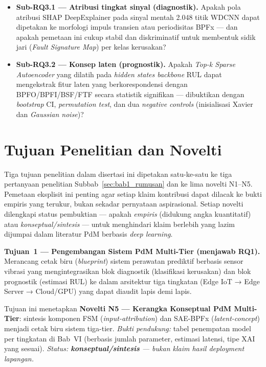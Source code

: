 \begin{itemize}
  \item \textbf{Sub-RQ3.1 — Atribusi tingkat sinyal (diagnostik).}
        Apakah pola atribusi SHAP DeepExplainer pada sinyal mentah
        2.048 titik WDCNN dapat dipetakan ke morfologi impuls transien
        atau periodisitas BPFx --- dan apakah pemetaan ini cukup
        stabil dan diskriminatif untuk membentuk sidik jari
        (\emph{Fault Signature Map}) per kelas kerusakan?
  \item \textbf{Sub-RQ3.2 — Konsep laten (prognostik).}
        Apakah \emph{Top-k Sparse Autoencoder} yang dilatih pada
        \emph{hidden states backbone} RUL dapat mengekstrak fitur
        laten yang berkorespondensi dengan BPFO/BPFI/BSF/FTF secara
        statistik signifikan --- dibuktikan dengan \emph{bootstrap} CI,
        \emph{permutation test}, dan dua \emph{negative controls}
        (inisialisasi Xavier dan \emph{Gaussian noise})?
\end{itemize}


\section{Tujuan Penelitian dan Novelti}
\label{sec:bab1_tujuan}

Tiga tujuan penelitian dalam disertasi ini dipetakan satu-ke-satu
ke tiga pertanyaan penelitian Subbab~\ref{sec:bab1_rumusan} dan ke lima
novelti N1–N5.
Pemetaan eksplisit ini penting agar setiap klaim kontribusi dapat
dilacak ke bukti empiris yang terukur, bukan sekadar pernyataan
aspirasional.
Setiap novelti dilengkapi status pembuktian --- apakah
\emph{empiris} (didukung angka kuantitatif) atau
\emph{konseptual/sintesis} --- untuk menghindari klaim berlebih yang
lazim dijumpai dalam literatur PdM berbasis \emph{deep learning}.

\textbf{Tujuan~1 — Pengembangan Sistem PdM Multi-Tier (menjawab RQ1).}
Merancang cetak biru (\emph{blueprint}) sistem perawatan prediktif
berbasis sensor vibrasi yang mengintegrasikan blok diagnostik
(klasifikasi kerusakan) dan blok prognostik (estimasi RUL) ke dalam
arsitektur tiga tingkatan (Edge IoT → Edge Server → Cloud/GPU) yang
dapat diaudit lapis demi lapis.

Tujuan ini menetapkan \textbf{Novelti N5 — Kerangka Konseptual PdM
Multi-Tier}: sintesis komponen FSM (\emph{input-attribution}) dan
SAE-BPFx (\emph{latent-concept}) menjadi cetak biru sistem tiga-tier.
\emph{Bukti pendukung:} tabel penempatan model per tingkatan di
Bab~VI (berbasis jumlah parameter, estimasi latensi, tipe XAI yang
sesuai).
\emph{Status: \textbf{konseptual/sintesis} — bukan klaim hasil
\emph{deployment} lapangan.}

